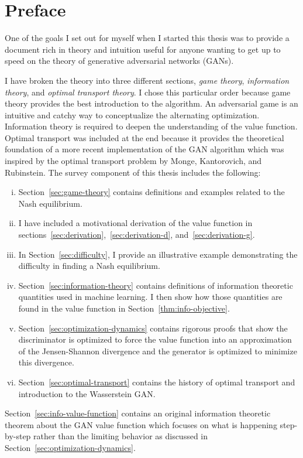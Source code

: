 \section*{Preface}

One of the goals I set out for myself when I started this thesis was
to provide a document rich in theory and intuition useful for anyone
wanting to get up to speed on the theory of generative adversarial
networks (GANs).

I have broken the theory into three different sections, \textit{game
  theory}, \textit{information theory}, and \textit{optimal transport
  theory}.  I chose this particular order because game theory provides
the best introduction to the algorithm.  An adversarial game is an
intuitive and catchy way to conceptualize the alternating
optimization.  Information theory is required to deepen the
understanding of the value function.  Optimal transport was included
at the end because it provides the theoretical foundation of a more
recent implementation of the GAN algorithm which was inspired by the
optimal transport problem by Monge, Kantorovich, and Rubinstein.  The
survey component of this thesis includes the following:
\begin{enumerate}[(i)]
\item Section~\ref{sec:game-theory} contains definitions and examples
  related to the Nash equilibrium.
\item I have included a motivational derivation of the value function
  in sections~\ref{sec:derivation},~\ref{sec:derivation-d},
  and~\ref{sec:derivation-g}.
\item In Section~\ref{sec:difficulty}, I provide an illustrative
  example demonstrating the difficulty in finding a Nash equilibrium.
\item Section~\ref{sec:information-theory} contains definitions of
  information theoretic quantities used in machine learning. I then
  show how those quantities are found in the value function in
  Section~\ref{thm:info-objective}.
\item Section~\ref{sec:optimization-dynamics} contains rigorous proofs
  that show the discriminator is optimized to force the value function
  into an approximation of the Jensen-Shannon divergence and the
  generator is optimized to minimize this divergence.
\item Section~\ref{sec:optimal-transport} contains the history of
  optimal transport and introduction to the Wasserstein GAN.
\end{enumerate}

Section~\ref{sec:info-value-function} contains an original information
theoretic theorem about the GAN value function which focuses on what
is happening step-by-step rather than the limiting behavior as
discussed in Section~\ref{sec:optimization-dynamics}.


